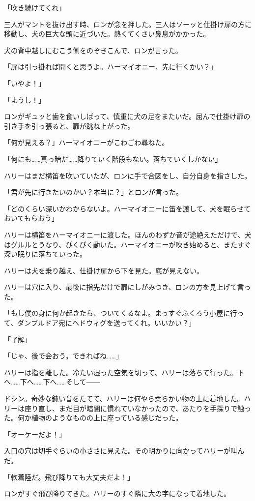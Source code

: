 \documentclass[10pt,a4paper]{article}
\begin{document}
\begin{CJK}{UTF8}{min}
「吹き続けてくれ」

三人がマントを抜け出す時、ロンが念を押した。三人はソーッと仕掛け扉の方に移動し、犬の巨大な頭に近づいた。熱くてくさい鼻息がかかった。

犬の背中越しにむこう側をのぞきこんで、ロンが言った。

「扉は引っ掛れば開くと思うよ。ハーマイオニー、先に行くかい？」

「いやよ！」

「ようし！」

ロンがギュッと歯を食いしばって、慎重に犬の足をまたいだ。屈んで仕掛け扉の引き手を引っ張ると、扉が跳ね上がった。

「何が見える？」ハーマイオニーがこわごわ尋ねた。

「何にも……真っ暗だ……降りていく階段もない。落ちていくしかない」

ハリーはまだ横笛を吹いていたが、ロンに手で合図をし、自分自身を指さした。

「君が先に行きたいのかい？本当に？」とロンが言った。

「どのくらい深いかわからないよ。ハーマイオニーに笛を渡して、犬を眠らせておいてもらおう」

ハリーは横笛をハーマイオニーに渡した。ほんのわずか音が途絶えただけで、犬はグルルとうなり、ぴくぴく動いた。ハーマイオニーが吹き始めると、またすぐ深い眠りに落ちていった。

ハリーは犬を乗り越え、仕掛け扉から下を見た。底が見えない。

ハリーは穴に入り、最後に指先だけで扉にしがみつき、ロンの方を見上げて言った。

「もし僕の身に何か起きたら、ついてくるなよ。まっすぐふくろう小屋に行って、ダンブルドア宛にヘドウィグを送ってくれ。いいかい？」

「了解」

「じゃ、後で会おう。できればね……」

ハリーは指を離した。冷たい湿った空気を切って、ハリーは落ちて行った。下へ……下へ……下へ……そして――

ドシン。奇妙な鈍い音をたてて、ハリーは何やら柔らかい物の上に着地した。ハリーは座り直し、まだ目が暗闇に慣れていなかったので、あたりを手探りで触った。何か植物のようなものの上に座っている感じだった。

「オーケーだよ！」

入口の穴は切手ぐらいの小ささに見えた。その明かりに向かってハリーが叫んだ。

「軟着陸だ。飛び降りても大丈夫だよ！」

ロンがすぐ飛び降りてきた。ハリーのすぐ隣に大の字になって着地した。


\end{CJK}
\end{document}
